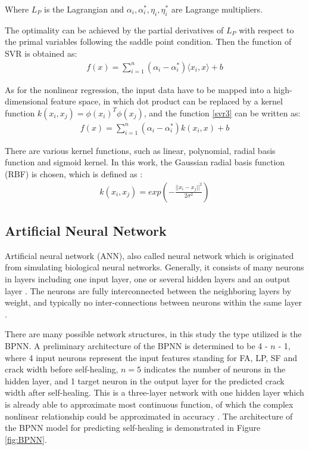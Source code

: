 \documentclass[11pt]{article}
\begin{document}
	Where $L_P$ is the Lagrangian and $ \alpha_i, \alpha_i^*, \eta_i, \eta_i^* $ are Lagrange multipliers.
	
	The optimality can be achieved by the partial derivatives of $L_P$ with respect to the primal variables following the saddle point condition. Then the function of SVR is obtained as:
	\begin{eqnarray}\label{svr3}
	f(x) = \sum_{i=1}^{n} (\alpha_i - \alpha_i^*)\langle x_i , x \rangle +b                                                             
	\end{eqnarray}
	
	As for the nonlinear regression, the input data have to be mapped into a high-dimensional feature space, in which dot product can be replaced by a kernel function $k(x_i, x_j) = \phi(x_i)^T\phi(x_j)$, and the function \eqref{svr3} can be written as:
	\begin{eqnarray}
	f(x) = \sum_{i=1}^{n}(\alpha_i - \alpha_i^*)k(x_i , x) +b                                                          
	\end{eqnarray}
	
	
	There are various kernel functions, such as linear, polynomial, radial basis function and sigmoid kernel.  In this work, the Gaussian radial basis function (RBF) is chosen, which is defined as \cite{smola2004tutorial}: 
	\begin{eqnarray}
	k(x_i, x_j) = exp ({- \frac{||x_i -x_j ||^2}{2 \sigma^2} })                                                           
	\end{eqnarray}
	
	
	\subsection{Artificial Neural Network}
	Artificial neural network (ANN), also called neural network which is originated from simulating biological neural networks. Generally, it consists of many neurons in layers including one input layer, one or several hidden layers and an output layer \cite{mukherjee1997artificial}. The neurons are fully interconnected between the neighboring layers by weight, and typically no inter-connections between neurons within the same layer \cite{naderpour2018compressive}. 
	
	There are many possible network structures, in this study the type utilized is the BPNN. A preliminary architecture of the BPNN is determined to be 4 - $n$ - 1, where 4 input neurons represent the input features standing for FA, LP, SF and crack width before self-healing, $n = 5$ indicates the number of neurons in the hidden layer, and 1 target neuron in the output layer for the predicted crack width after self-healing. This is a three-layer network with one hidden layer which is already able to approximate most continuous function, of which the complex nonlinear relationship could be approximated in accuracy \cite{yan2017evaluation}. The architecture of the BPNN model for predicting self-healing is demonstrated in Figure \ref{fig:BPNN}. %
	
\end{document}
